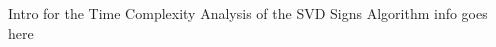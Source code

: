 \documentclass[../../ClusteringConnectionsMAIN.tex]{subfiles}
\begin{document}
\begin{flushleft}
\begin{large}

Intro for the Time Complexity Analysis of the SVD Signs Algorithm info goes here


\end{large}
\end{flushleft}
\end{document}
